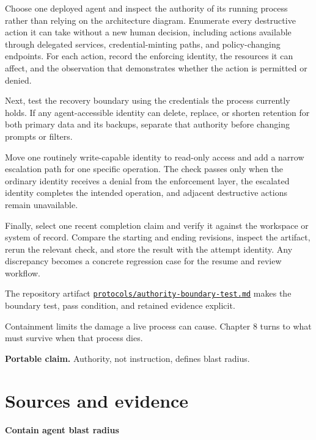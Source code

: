 Choose one deployed agent and inspect the authority of its running process rather than relying on the architecture diagram. Enumerate every destructive action it can take without a new human decision, including actions available through delegated services, credential-minting paths, and policy-changing endpoints. For each action, record the enforcing identity, the resources it can affect, and the observation that demonstrates whether the action is permitted or denied.

Next, test the recovery boundary using the credentials the process currently holds. If any agent-accessible identity can delete, replace, or shorten retention for both primary data and its backups, separate that authority before changing prompts or filters.

Move one routinely write-capable identity to read-only access and add a narrow escalation path for one specific operation. The check passes only when the ordinary identity receives a denial from the enforcement layer, the escalated identity completes the intended operation, and adjacent destructive actions remain unavailable.

Finally, select one recent completion claim and verify it against the workspace or system of record. Compare the starting and ending revisions, inspect the artifact, rerun the relevant check, and store the result with the attempt identity. Any discrepancy becomes a concrete regression case for the resume and review workflow.

The repository artifact \href{https://github.com/sjarmak/engineering-reliable-coding-agents/blob/main/protocols/authority-boundary-test.md}{\texttt{protocols/authority-boundary-test.md}} makes the boundary test, pass condition, and retained evidence explicit.

Containment limits the damage a live process can cause. Chapter 8 turns to what must survive when that process dies.

\textbf{Portable claim.} Authority, not instruction, defines blast radius.

\section*{Sources and evidence}

\textbf{Contain agent blast radius}

